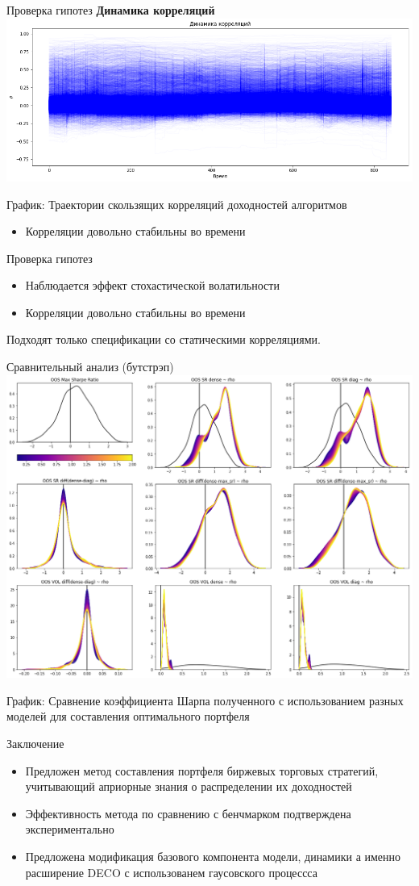 \documentclass[14pt]{beamer}
\begin{document}
\begin{frame}{Проверка гипотез}
\textbf{Динамика корреляций}
\includegraphics[width=\linewidth]{correlations}

График: Траектории скользящих корреляций доходностей алгоритмов
\begin{itemize}
	\item Корреляции довольно стабильны во времени
\end{itemize}
\end{frame}
\begin{frame}{Проверка гипотез}
\begin{itemize}
	\item Наблюдается эффект стохастической волатильности
	\item Корреляции довольно стабильны во времени
\end{itemize}
Подходят только спецификации со статическими корреляциями.

\end{frame}
\begin{frame}{Сравнительный анализ (бутстрэп)}
\includegraphics[width=.7\linewidth]{performance}
	
График: Сравнение коэффициента Шарпа полученного с использованием разных моделей для составления оптимального портфеля
\end{frame}
\begin{frame}{Заключение}
\begin{itemize}
	\item Предложен метод составления портфеля биржевых торговых
стратегий, учитывающий априорные знания о распределении их доходностей
	\item Эффективность метода по сравнению с бенчмарком подтверждена экспериментально
	\item Предложена модификация базового компонента модели, динамики а именно расширение DECO с использованем гаусовского процессса
\end{itemize}
\end{frame}
\end{document}
